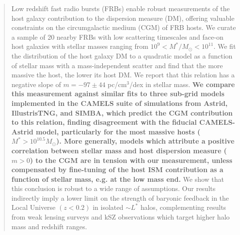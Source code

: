 \documentclass[twocolumn,linenumbers]{aastex631}
\newcommand{\msbold}[1]{\textbf{#1}}
\begin{document}






\begin{abstract}
Low redshift fast radio bursts (FRBs) enable robust measurements of the host galaxy contribution to the dispersion measure (DM), offering valuable constraints on the circumgalactic medium (CGM) of FRB hosts.
We curate a sample of 20 nearby FRBs with low scattering timescales and face-on host galaxies with stellar masses ranging from $10^9 < M^* / M_\odot < 10^{11}$.
We fit the distribution of the host galaxy DM to a quadratic model as a function of stellar mass with a mass-independent scatter and find that the more massive the host, the lower its host DM.
We report that this relation has a negative slope of $m = -97 \pm 44$ pc/cm$^{3}$/dex in stellar mass. 
\msbold{We compare this measurement against similar fits to three sub-grid models implemented in the CAMELS suite of simulations from Astrid, IllustrisTNG, and SIMBA, which predict the CGM contribution to this relation, finding disagreement with the fiducial CAMELS-Astrid model, particularly for the most massive hosts ($M^* > 10^{10.5} M_\odot$).
More generally, models which attribute a positive correlation between stellar mass and host dispersion measure ($m > 0$) to the CGM are in tension with our measurement, unless compensated by fine-tuning of the host ISM contribution as a function of stellar mass, e.g. at the low mass end.} 
We show that this conclusion is robust to a wide range of assumptions.
Our results indirectly imply a lower limit on the strength of baryonic feedback in the Local Universe $(z < 0.2)$ in isolated $\sim L^*$ halos, complementing results from weak lensing surveys and kSZ observations which target higher halo mass and redshift ranges.
\end{abstract}
\end{document}
